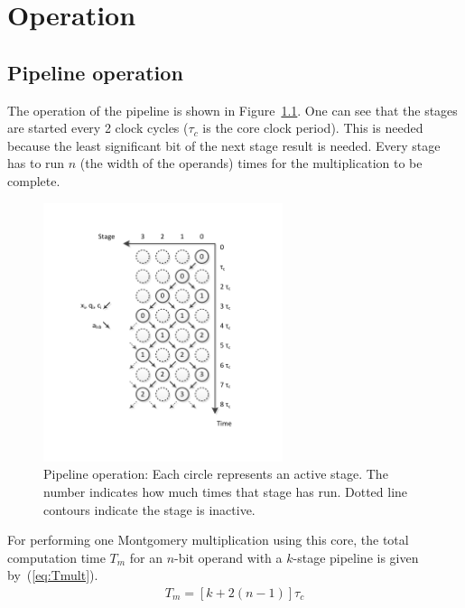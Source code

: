 \chapter{Operation}

\section{Pipeline operation}
The operation of the pipeline is shown in Figure~\ref{fig:pipeline_op}. One can see that the stages are started
every 2 clock cycles ($\tau_{c}$ is the core clock period). This is needed because the least significant bit of the next
stage result is needed. Every stage has to run $n$ (the width of the operands) times for the multiplication to be complete.

\begin{figure}[H]	
\centering
\includegraphics[trim=1.2cm 1.2cm 1.2cm 1.2cm, width=7cm]{pictures/pipeline_operation.pdf}
\caption{Pipeline operation: Each circle represents an active stage. The number indicates how much times that stage 
		has run. Dotted line contours indicate the stage is inactive.}
\label{fig:pipeline_op}
\end{figure}

For performing one Montgomery multiplication using this core, the total computation time $T_m$ for an $n$-bit operand
with a $k$-stage pipeline is given by~(\ref{eq:Tmult}).
\begin{align}\label{eq:Tmult}
T_{m} = \left[k + 2(n - 1)\right] \tau_c
\end{align}
\newpage
